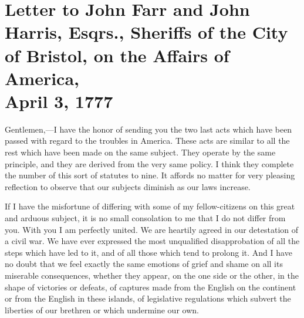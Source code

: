 



\chapter*[Letter to the Sheriffs of Bristol]{
Letter to John Farr and John Harris, Esqrs., Sheriffs of the City of Bristol,
on the Affairs of America,
\\ \vspace{0.1cm}\large{April 3, 1777}}

Gentlemen,—I have the honor of sending you the two last acts which have been passed with regard to the troubles in America. These acts are similar to all the rest which have been made on the same subject. They operate by the same principle, and they are derived from the very same policy. I think they complete the number of this sort of statutes to nine. It affords no matter for very pleasing reflection to observe that our subjects diminish as our laws increase.

If I have the misfortune of differing with some of my fellow-citizens on this great and arduous subject, it is no small consolation to me that I do not differ from you. With you I am perfectly united. We are heartily agreed in our detestation of a civil war. We have ever expressed the most unqualified disapprobation of all the steps which have led to it, and of all those which tend to prolong it. And I have no doubt that we feel exactly the same emotions of grief and shame on all its miserable consequences, whether they appear, on the one side or the other, in the shape of victories or defeats, of captures made from the English on the continent or from the English in these islands, of legislative regulations which subvert the liberties of our brethren or which undermine our own.

